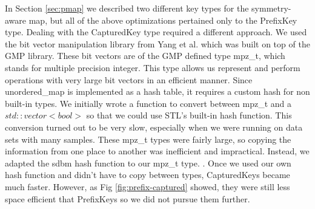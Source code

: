 In Section \ref{sec:pmap} we described two different key types for the symmetry-aware map, but all of the above optimizations pertained only to the PrefixKey type.
Dealing with the CapturedKey type required a different approach.
We used the bit vector manipulation library from Yang et al. \cite{YangRuSe16} which was built on top of the GMP library.
These bit vectors are of the GMP defined type mpz\_t, which stands for multiple precision integer.
This type allows us represent and perform operations with very large bit vectors in an efficient manner.
Since unordered\_map is implemented as a hash table, it requires a custom hash for non built-in types.
We initially wrote a function to convert between mpz\_t and a $std::vector<bool>$ so that we could use STL's built-in hash function.
This conversion turned out to be very slow, especially when we were running on data sets with many samples.
These mpz\_t types were fairly large, so copying the information from one place to another was inefficient and impractical.
Instead, we adapted the sdbm hash function to our mpz\_t type. \cite{HashFunctions}.
Once we used our own hash function and didn't have to copy between types, CapturedKeys became much faster.
However, as Fig \ref{fig:prefix-captured} showed, they were still less space efficient that PrefixKeys so we did not pursue them further.

